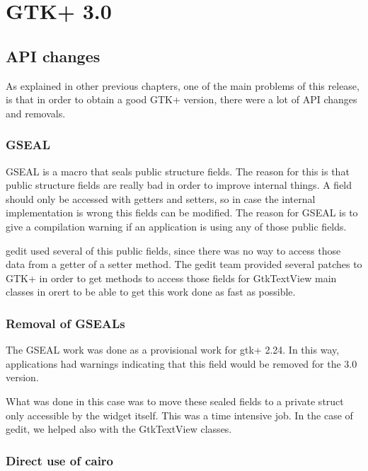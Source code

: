 

\chapter{GTK+ 3.0}


\section{API changes}

As explained in other previous chapters, one of the main problems of this release, is that in order to obtain a good GTK+ version, there were a lot of API changes and removals.

\subsection{GSEAL}

GSEAL is a macro that seals public structure fields. The reason for this is that public structure fields are really bad 
in order to improve internal things. A field should only be accessed with getters and setters, so in case the internal 
implementation is wrong this fields can be modified. The reason for GSEAL is to give a compilation warning if an application 
is using any of those public fields.

gedit used several of this public fields, since there was no way to access those data from a getter of a setter method. 
The gedit team provided several patches to GTK+ in order to get methods to access those fields for GtkTextView main classes 
in orert to be able to get this work done as fast as possible.

\subsection{Removal of GSEALs}

The GSEAL work was done as a provisional work for gtk+ 2.24.  In this way,  applications had warnings indicating that this field 
would be removed for the 3.0 version.

What was done in this case was to move these sealed fields to a private struct only accessible by the widget itself. 
This was a time intensive job. In the case of gedit, we helped also with the GtkTextView classes.

\subsection{Direct use of cairo}

